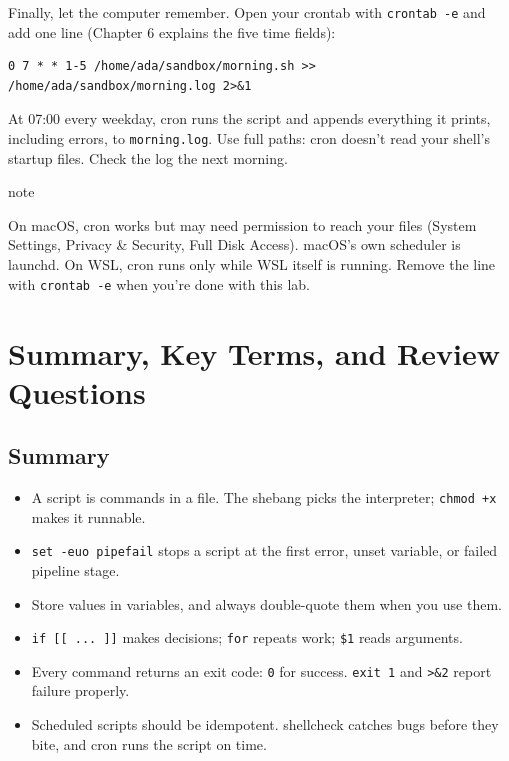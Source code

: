 Finally, let the computer remember. Open your crontab with \texttt{crontab\ -e} and add one line (Chapter 6 explains the five time fields):

\begin{codeblock}
\begin{Verbatim}[formatcom=\outputstyle]
0 7 * * 1-5 /home/ada/sandbox/morning.sh >> /home/ada/sandbox/morning.log 2>&1
\end{Verbatim}
\end{codeblock}

At 07:00 every weekday, cron runs the script and appends everything it prints, including errors, to \texttt{morning.log}. Use full paths: cron doesn't read your shell's startup files. Check the log the next morning.

\begin{callout}{note}

On macOS, cron works but may need permission to reach your files (System Settings, Privacy \& Security, Full Disk Access). macOS's own scheduler is launchd. On WSL, cron runs only while WSL itself is running. Remove the line with \texttt{crontab\ -e} when you're done with this lab.

\end{callout}

\section{Summary, Key Terms, and Review Questions}\label{09-lab-automate-a-daily-chore:summary-key-terms-and-review-questions}

\subsection*{Summary}\label{09-lab-automate-a-daily-chore:summary}

\begin{itemize}
\tightlist
\item
  A script is commands in a file. The shebang picks the interpreter; \texttt{chmod\ +x} makes it runnable.
\item
  \texttt{set\ -euo\ pipefail} stops a script at the first error, unset variable, or failed pipeline stage.
\item
  Store values in variables, and always double-quote them when you use them.
\item
  \texttt{if\ {[}{[}\ ...\ {]}{]}} makes decisions; \texttt{for} repeats work; \texttt{\$1} reads arguments.
\item
  Every command returns an exit code: \texttt{0} for success. \texttt{exit\ 1} and \texttt{\textgreater{}\&2} report failure properly.
\item
  Scheduled scripts should be idempotent. shellcheck catches bugs before they bite, and cron runs the script on time.
\end{itemize}

